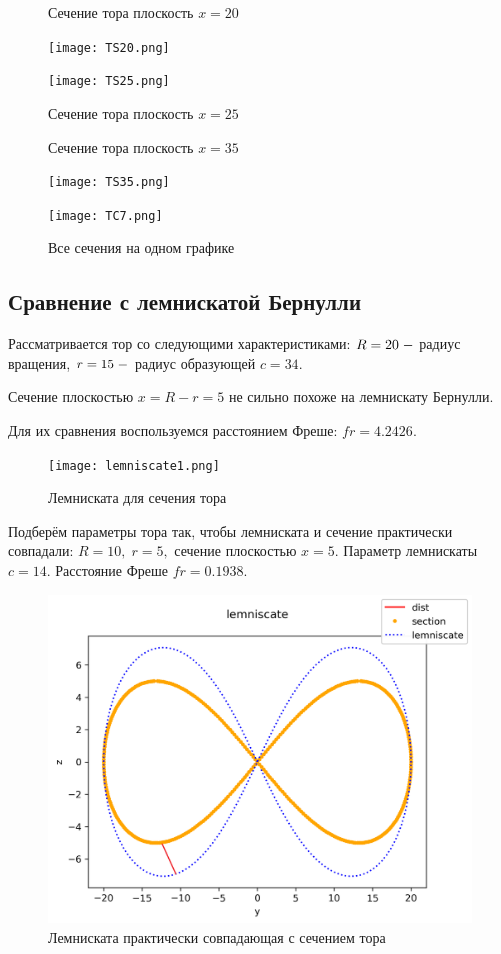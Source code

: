 \documentclass[a4]{article}
\begin{document}
\begin{figure}[H]
\caption{Сечение тора плоскость $x=20$ }
\texttt{[image: TS20.png]} 

\caption{Сечение тора плоскость $x=25$ }
\texttt{[image: TS25.png]} 
\end{figure}

\begin{figure}[H]
\caption{Сечение тора плоскость $x=35$ }
\texttt{[image: TS35.png]} 

\caption{Все сечения на одном графике }
\texttt{[image: TC7.png]} 
\end{figure}

\newpage

\subsection{Сравнение с лемнискатой Бернулли}
Рассматривается тор со следующими характеристиками: $R=20\;\--$ радиус вращения, $r=15\;\--$ радиус образующей $c=34.$

Сечение плоскостью $x=R-r=5$ не сильно похоже на лемнискату Бернулли. 

Для их сравнения воспользуемся расстоянием Фреше: $fr = 4.2426.$


\begin{figure}[H]
\caption{Лемниската для сечения тора }
\texttt{[image: lemniscate1.png]} 
\end{figure}


Подберём параметры тора так, чтобы лемниската и сечение практически совпадали:
$R=10,\; r = 5,$ сечение плоскостью $x=5.$ Параметр лемнискаты $c=14.$ Расстояние Фреше $fr = 0.1938.$

\begin{figure}[H]
\caption{Лемниската практически совпадающая с сечением тора }
\includegraphics[scale=0.9]{lemniscate.png} 
\end{figure}
\end{document}

